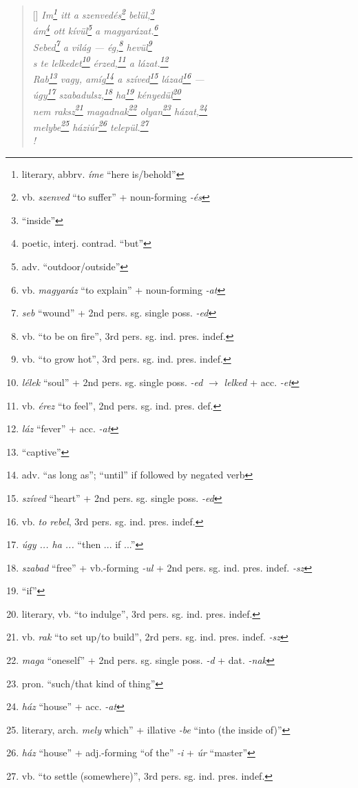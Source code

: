 \documentclass[a4paper,12pt,twoside,final]{book}
\begin{document}
\begin{verse}[\versewidth]
  \it
  Im\footnote{literary, abbrv. \emph{íme} ``here is/behold''}
  itt a szenvedés\footnote{vb. \emph{szenved} ``to suffer''
  + noun-forming \emph{-és}} belül,\footnote{``inside''} \\
  ám\footnote{poetic, interj. contrad. ``but''} ott
  kívül\footnote{adv. ``outdoor/outside''} a
  magyarázat.\footnote{vb. \emph{magyaráz} ``to explain'' +
  noun-forming \emph{-at}} \\
  Sebed\footnote{\emph{seb} ``wound'' + 2nd
  pers. sg. single poss. \emph{-ed}} a világ --- ég,\footnote{vb.
  ``to be on fire'', 3rd pers. sg. ind. pres. indef.}
  hevül\footnote{vb. ``to grow hot'', 3rd
  pers. sg. ind. pres. indef.} \\
  s te lelkedet\footnote{\emph{lélek} ``soul'' + 2nd
  pers. sg. single poss. \emph{-ed} $\rightarrow$ \emph{lelked} +
  acc. \emph{-et}} érzed,\footnote{vb. \emph{érez} ``to feel'', 2nd
  pers. sg. ind. pres. def.} a lázat.\footnote{\emph{láz} ``fever'' +
  acc. \emph{-at}} \\
  Rab\footnote{``captive''} vagy, amíg\footnote{adv. ``as long as'';
  ``until'' if followed by negated verb} a
  szíved\footnote{\emph{szíved} ``heart'' + 2nd pers. sg. single
  poss. \emph{-ed}} lázad\footnote{vb. \emph{to rebel}, 3rd
  pers. sg. ind. pres. indef.} --- \\
  úgy\footnote{\emph{úgy ... ha ...} ``then ... if ...''}
  szabadulsz,\footnote{\emph{szabad} ``free'' + vb.-forming \emph{-ul}
  + 2nd pers. sg. ind. pres. indef. \emph{-sz}} ha\footnote{``if''}
  kényedül\footnote{literary, vb. ``to indulge'', 3rd
  pers. sg. ind. pres. indef.} \\
  nem raksz\footnote{vb. \emph{rak} ``to set up/to build'', 2rd
  pers. sg. ind. pres. indef. \emph{-sz}}
  magadnak\footnote{\emph{maga} ``oneself'' + 2nd pers. sg. single
  poss. \emph{-d} + dat. \emph{-nak}}
  olyan\footnote{pron. ``such/that kind of thing''}
  házat,\footnote{\emph{ház} ``house'' + acc. \emph{-at}} \\
  melybe\footnote{literary, arch. \emph{mely}
   which'' + illative \emph{-be} ``into (the inside of)''}
  háziúr\footnote{\emph{ház} ``house'' + adj.-forming ``of the''
  \emph{-i} + \emph{úr} ``master''} települ.\footnote{vb. ``to
  settle (somewhere)'', 3rd pers. sg. ind. pres. indef.} \\!
\end{verse}

\newpage
\end{document}
